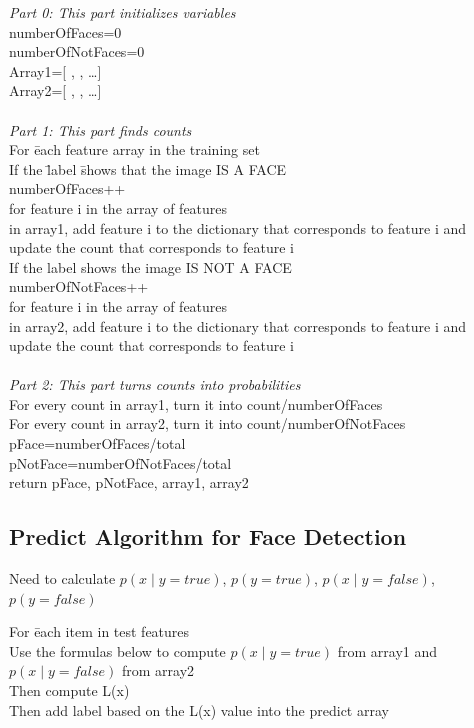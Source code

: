 \documentclass{article}
\begin{document}
\begin{tabbing}
\textit{Part 0: This part initializes variables}\\
numberOfFaces=0\\
numberOfNotFaces=0\\
Array1=[ {} ,  {}, {}…]\\
Array2=[ {} ,  {}, {}…]\\\\
\textit{Part 1: This part finds counts}\\
For \=each feature array in the training set\\
	\>  If the \= label \=shows that the image IS A FACE\\
	\> \> 	numberOfFaces++\\
	\> \> 	for feature i in the array of features\\
	\> \> 	\> 	in array1, add feature i to the dictionary that corresponds to feature i and \\
	\> \> 	\> 	update the count that corresponds to feature i\\
	\>If the label shows the image IS NOT A FACE\\
	\> \>	numberOfNotFaces++\\
	\> \>	for feature i in the array of features\\
	\> \>\>	in array2, add feature i to the dictionary that corresponds to feature i and \\
	\> \> 	\> 	update the count that corresponds to feature i\\\\
\textit{Part 2: This part turns counts into probabilities}\\
For every count in array1, turn it into count/numberOfFaces\\
For every count in array2, turn it into count/numberOfNotFaces\\
pFace=numberOfFaces/total\\
pNotFace=numberOfNotFaces/total\\
return pFace, pNotFace, array1, array2\\ 
\end{tabbing}
\subsection{Predict Algorithm for Face Detection}

Need to calculate $p(x\mid y = true)$, $p(y = true)$, $p(x\mid y = f alse)$, $p(y = f alse)$

\begin{tabbing}
For \=each item in test features\\
	\> Use the formulas below to compute $p(x\mid y = true)$ from array1 and $p(x\mid y = f alse)$ from array2\\
	\> Then compute L(x)\\
	\> Then add label based on the L(x) value into the predict array
\end{tabbing}
\end{document}
